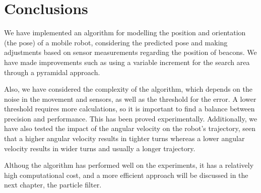 \section{Conclusions}
We have implemented an algorithm for modelling the position and orientation (the pose) of a mobile robot, considering the predicted pose and making adjustments based on sensor measurements regarding the position of beacons.
We have made improvements such as using a variable increment for the search area through a pyramidal approach.

\bigskip Also, we have considered the complexity of the algorithm, which depends on the noise in the movement and sensors, as well as the threshold for the error. A lower threshold requires more calculations, so it is important to find a balance between precision and performance.
This has been proved experimentally. Additionally, we have also tested the impact of the angular velocity on the robot's trajectory, seen that a higher angular velocity results in tighter turns whereas a lower angular velocity results in wider turns and usually a longer trajectory.

\bigskip Althoug the algorithm has performed well on the experiments, it has a relatively high computational cost, and a more efficient approach will be discussed in the next chapter, the particle filter.
